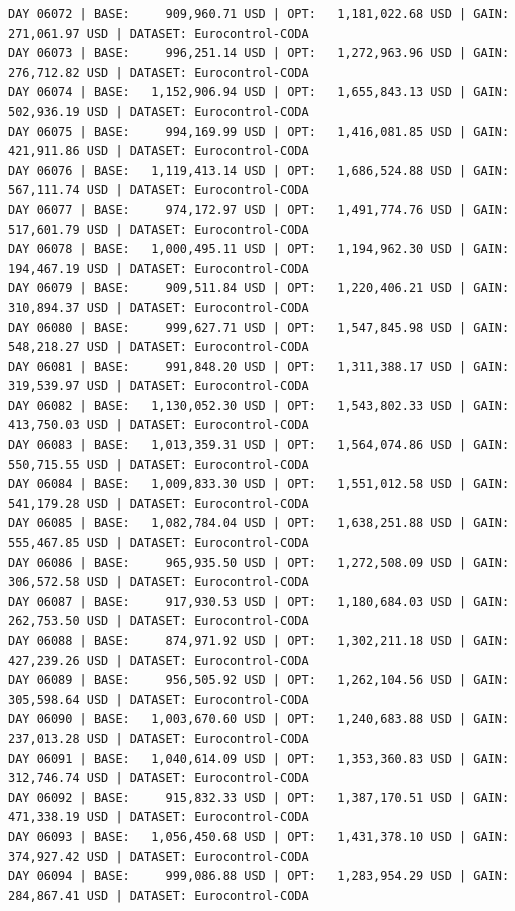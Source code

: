 \documentclass[11pt,a4paper]{article}
\begin{document}
\begin{verbatim}
DAY 06072 | BASE:     909,960.71 USD | OPT:   1,181,022.68 USD | GAIN: 271,061.97 USD | DATASET: Eurocontrol-CODA
DAY 06073 | BASE:     996,251.14 USD | OPT:   1,272,963.96 USD | GAIN: 276,712.82 USD | DATASET: Eurocontrol-CODA
DAY 06074 | BASE:   1,152,906.94 USD | OPT:   1,655,843.13 USD | GAIN: 502,936.19 USD | DATASET: Eurocontrol-CODA
DAY 06075 | BASE:     994,169.99 USD | OPT:   1,416,081.85 USD | GAIN: 421,911.86 USD | DATASET: Eurocontrol-CODA
DAY 06076 | BASE:   1,119,413.14 USD | OPT:   1,686,524.88 USD | GAIN: 567,111.74 USD | DATASET: Eurocontrol-CODA
DAY 06077 | BASE:     974,172.97 USD | OPT:   1,491,774.76 USD | GAIN: 517,601.79 USD | DATASET: Eurocontrol-CODA
DAY 06078 | BASE:   1,000,495.11 USD | OPT:   1,194,962.30 USD | GAIN: 194,467.19 USD | DATASET: Eurocontrol-CODA
DAY 06079 | BASE:     909,511.84 USD | OPT:   1,220,406.21 USD | GAIN: 310,894.37 USD | DATASET: Eurocontrol-CODA
DAY 06080 | BASE:     999,627.71 USD | OPT:   1,547,845.98 USD | GAIN: 548,218.27 USD | DATASET: Eurocontrol-CODA
DAY 06081 | BASE:     991,848.20 USD | OPT:   1,311,388.17 USD | GAIN: 319,539.97 USD | DATASET: Eurocontrol-CODA
DAY 06082 | BASE:   1,130,052.30 USD | OPT:   1,543,802.33 USD | GAIN: 413,750.03 USD | DATASET: Eurocontrol-CODA
DAY 06083 | BASE:   1,013,359.31 USD | OPT:   1,564,074.86 USD | GAIN: 550,715.55 USD | DATASET: Eurocontrol-CODA
DAY 06084 | BASE:   1,009,833.30 USD | OPT:   1,551,012.58 USD | GAIN: 541,179.28 USD | DATASET: Eurocontrol-CODA
DAY 06085 | BASE:   1,082,784.04 USD | OPT:   1,638,251.88 USD | GAIN: 555,467.85 USD | DATASET: Eurocontrol-CODA
DAY 06086 | BASE:     965,935.50 USD | OPT:   1,272,508.09 USD | GAIN: 306,572.58 USD | DATASET: Eurocontrol-CODA
DAY 06087 | BASE:     917,930.53 USD | OPT:   1,180,684.03 USD | GAIN: 262,753.50 USD | DATASET: Eurocontrol-CODA
DAY 06088 | BASE:     874,971.92 USD | OPT:   1,302,211.18 USD | GAIN: 427,239.26 USD | DATASET: Eurocontrol-CODA
DAY 06089 | BASE:     956,505.92 USD | OPT:   1,262,104.56 USD | GAIN: 305,598.64 USD | DATASET: Eurocontrol-CODA
DAY 06090 | BASE:   1,003,670.60 USD | OPT:   1,240,683.88 USD | GAIN: 237,013.28 USD | DATASET: Eurocontrol-CODA
DAY 06091 | BASE:   1,040,614.09 USD | OPT:   1,353,360.83 USD | GAIN: 312,746.74 USD | DATASET: Eurocontrol-CODA
DAY 06092 | BASE:     915,832.33 USD | OPT:   1,387,170.51 USD | GAIN: 471,338.19 USD | DATASET: Eurocontrol-CODA
DAY 06093 | BASE:   1,056,450.68 USD | OPT:   1,431,378.10 USD | GAIN: 374,927.42 USD | DATASET: Eurocontrol-CODA
DAY 06094 | BASE:     999,086.88 USD | OPT:   1,283,954.29 USD | GAIN: 284,867.41 USD | DATASET: Eurocontrol-CODA

\end{verbatim}
\end{document}
